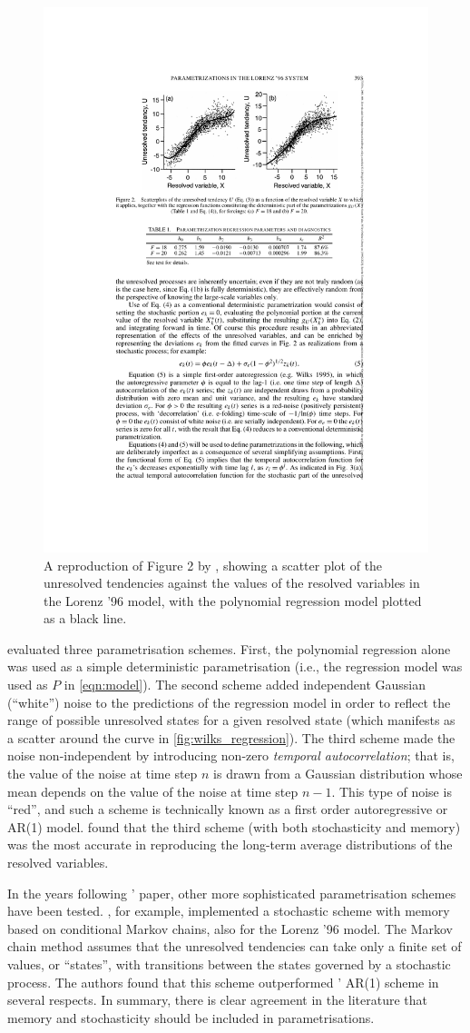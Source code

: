 \documentclass[titlepage]{article}
\begin{document}
\begin{figure}
    \centering
    \includegraphics[width=0.35\linewidth]{figures/wilks_regression.pdf}
    \caption{
        A reproduction of Figure 2 by \textcite{wilks2005}, showing a
        scatter plot of the unresolved tendencies against the values of
        the resolved variables in the Lorenz '96 model, with the
        polynomial regression model plotted as a black line.
    }
    \label{fig:wilks_regression}
\end{figure}

\citeauthor{wilks2005} evaluated three parametrisation schemes. First, the
polynomial regression alone was used as a simple deterministic parametrisation
(i.e., the regression model was used as $P$ in \autoref{eqn:model}). The second
scheme added independent Gaussian (``white'') noise to the predictions of the
regression model in order to reflect the range of possible unresolved states
for a given resolved state (which manifests as a scatter around the curve in
\autoref{fig:wilks_regression}). The third scheme made the noise
non-independent by introducing non-zero \emph{temporal autocorrelation}; that
is, the value of the noise at time step $n$ is drawn from a Gaussian
distribution whose mean depends on the value of the noise at time step $n-1$.
This type of noise is ``red'', and such a scheme is technically known as a
first order autoregressive or AR(1) model. \citeauthor{wilks2005} found that
the third scheme (with both stochasticity and memory) was the most accurate in
reproducing the long-term average distributions of the resolved variables.

In the years following \citeauthor{wilks2005}' paper, other more sophisticated
parametrisation schemes have been tested. \textcite{crommelin2008}, for
example, implemented a stochastic scheme with memory based on conditional
Markov chains, also for the Lorenz '96 model. The Markov chain method assumes
that the unresolved tendencies can take only a finite set of values, or
``states'', with transitions between the states governed by a stochastic
process. The authors found that this scheme outperformed
\citeauthor{wilks2005}' AR(1) scheme in several respects. In summary, there
is clear agreement in the literature that memory and stochasticity should
be included in parametrisations.
\end{document}
